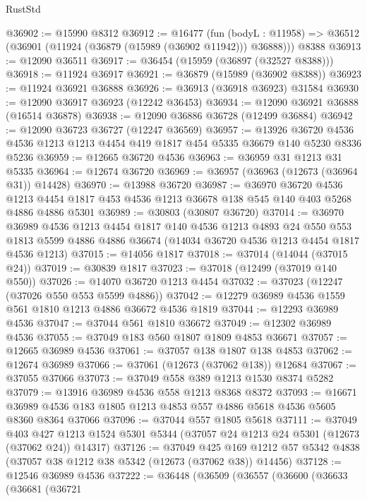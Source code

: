 \begin{lexlean}{RustStd}
\begin{coremodule}
@36902 := @15990 @8312
@36912 := @16477
    (fun (bodyL : @11958) => @36512 (@36901 (@11924 (@36879 (@15989 (@36902 @11942))) @36888)))
    @8388
@36913 := @12090 @36511
@36917 := @36454 (@15959 (@36897 (@32527 @8388)))
@36918 := @11924 @36917
@36921 := @36879 (@15989 (@36902 @8388))
@36923 := @11924 @36921 @36888
@36926 := @36913 (@36918 @36923) @31584
@36930 := @12090 @36917 @36923 (@12242 @36453)
@36934 := @12090 @36921 @36888 (@16514 @36878)
@36938 := @12090 @36886 @36728 (@12499 @36884)
@36942 := @12090 @36723 @36727 (@12247 @36569)
@36957 := @13926
    @36720
    @4536
    @4536
    @1213
    @1213
    @4454
    @419
    @1817
    @454
    @5335
    @36679
    @140
    @5230
    @8336
    @5236
@36959 := @12665 @36720 @4536
@36963 := @36959 @31 @1213 @31 @5335
@36964 := @12674 @36720
@36969 := @36957 (@36963 (@12673 (@36964 @31)) @14428)
@36970 := @13988 @36720
@36987 := @36970
    @36720
    @4536
    @1213
    @4454
    @1817
    @453
    @4536
    @1213
    @36678
    @138
    @545
    @140
    @403
    @5268
    @4886
    @4886
    @5301
@36989 := @30803 (@30807 @36720)
@37014 := @36970
    @36989
    @4536
    @1213
    @4454
    @1817
    @140
    @4536
    @1213
    @4893
    @24
    @550
    @553
    @1813
    @5599
    @4886
    @4886
    @36674
    (@14034 @36720 @4536 @1213 @4454 @1817 @4536 @1213)
@37015 := @14056 @1817
@37018 := @37014 (@14044 (@37015 @24))
@37019 := @30839 @1817
@37023 := @37018 (@12499 (@37019 @140 @550))
@37026 := @14070 @36720 @1213 @4454
@37032 := @37023 (@12247 (@37026 @550 @553 @5599 @4886))
@37042 := @12279 @36989 @4536 @1559 @561 @1810 @1213 @4886 @36672 @4536 @1819
@37044 := @12293 @36989 @4536
@37047 := @37044 @561 @1810 @36672
@37049 := @12302 @36989 @4536
@37055 := @37049 @183 @560 @1807 @1809 @4853 @36671
@37057 := @12665 @36989 @4536
@37061 := @37057 @138 @1807 @138 @4853
@37062 := @12674 @36989
@37066 := @37061 (@12673 (@37062 @138)) @12684
@37067 := @37055 @37066
@37073 := @37049 @558 @389 @1213 @1530 @8374 @5282
@37079 := @13916 @36989 @4536 @558 @1213 @8368 @8372
@37093 := @16671 @36989 @4536 @183 @1805 @1213 @4853 @557 @4886 @5618 @4536 @5605 @8360 @8364 @37066
@37096 := @37044 @557 @1805 @5618
@37111 := @37049
    @403
    @427
    @1213
    @1524
    @5301
    @5344
    (@37057 @24 @1213 @24 @5301 (@12673 (@37062 @24)) @14317)
@37126 := @37049
    @425
    @169
    @1212
    @57
    @5342
    @4838
    (@37057 @38 @1212 @38 @5342 (@12673 (@37062 @38)) @14456)
@37128 := @12546 @36989 @4536
@37222 := @36448
    (@36509
      (@36557
        (@36600
          (@36633
            (@36681
              (@36721

\end{coremodule}
\end{lexlean}
